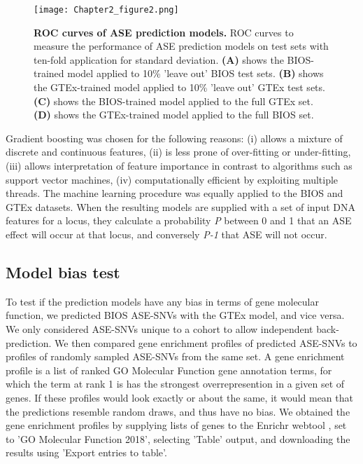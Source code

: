 \documentclass{book}
\begin{document}
\begin{refsection}
\begin{figure}[!hbt]
  \texttt{[image: Chapter2\_figure2.png]}
  \caption{
    \label{fig:figure2} \textbf{ROC curves of ASE prediction models.}
    ROC curves to measure the performance of ASE prediction models on test sets with ten-fold application for standard deviation.
    \textbf{(A)} shows the BIOS-trained model applied to 10\% 'leave out' BIOS test sets.
    \textbf{(B)} shows the GTEx-trained model applied to 10\% 'leave out' GTEx test sets.
    \textbf{(C)} shows the BIOS-trained model applied to the full GTEx set.
    \textbf{(D)} shows the GTEx-trained model applied to the full BIOS set.
  }
\end{figure}

Gradient boosting was chosen for the following reasons:
(i) allows a mixture of discrete and continuous features,
(ii) is less prone of over-fitting or under-fitting,
(iii) allows interpretation of feature importance in contrast to algorithms such as support vector machines,
(iv) computationally efficient by exploiting multiple threads.
The machine learning procedure was equally applied to the BIOS and GTEx datasets.
When the resulting models are supplied with a set of input DNA features for a locus, they calculate a probability \textsl{P} between 0 and 1 that an ASE effect will occur at that locus, and conversely \textsl{P-1} that ASE will not occur.

\subsection*{Model bias test}
To test if the prediction models have any bias in terms of gene molecular function, we predicted BIOS ASE-SNVs with the GTEx model, and vice versa.
We only considered ASE-SNVs unique to a cohort to allow independent back-prediction.
We then compared gene enrichment profiles of predicted ASE-SNVs to profiles of randomly sampled ASE-SNVs from the same set.
A gene enrichment profile is a list of ranked GO Molecular Function gene annotation terms, for which the term at rank 1 is has the strongest overrepresention in a given set of genes.
If these profiles would look exactly or about the same, it would mean that the predictions resemble random draws, and thus have no bias.
We obtained the gene enrichment profiles by supplying lists of genes to the Enrichr webtool \cite{Chen2013Enrichr,Kuleshov2016Enrichr}, set to 'GO Molecular Function 2018', selecting 'Table' output, and downloading the results using 'Export entries to table'.


\end{refsection}
\end{document}
